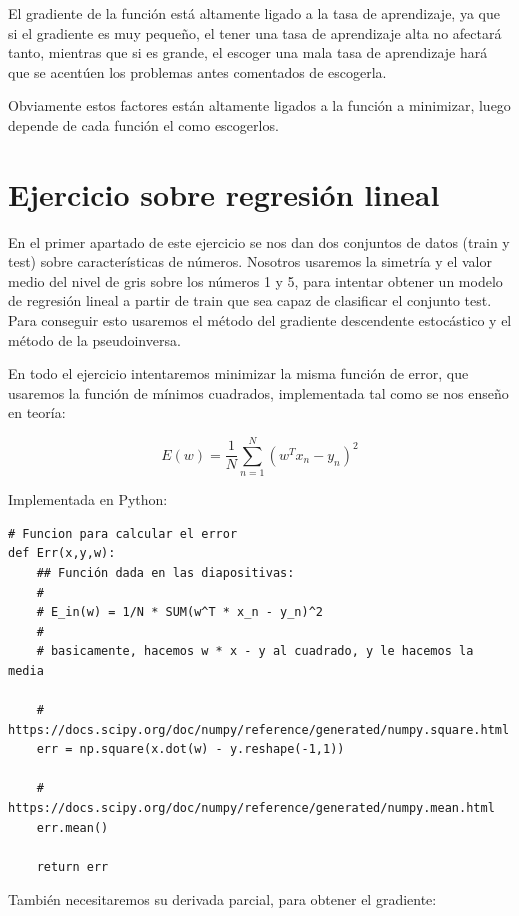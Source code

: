 \documentclass[12pt, spanish]{article}
\begin{document}
El gradiente de la función está altamente ligado a la tasa de aprendizaje, ya que si el gradiente es muy pequeño, el tener una tasa de aprendizaje alta no afectará tanto, mientras que si es grande, el escoger una mala tasa de aprendizaje hará que se acentúen los problemas antes comentados de escogerla.

Obviamente estos factores están altamente ligados a la función a minimizar, luego depende de cada función el como escogerlos.









\section{Ejercicio sobre regresión lineal}

En el primer apartado de este ejercicio se nos dan dos conjuntos de datos (train y test) sobre características de números. Nosotros usaremos la simetría y el valor medio del nivel de gris sobre los números 1 y 5, para intentar obtener un modelo de regresión lineal a partir de train que sea capaz de clasificar el conjunto test. Para conseguir esto usaremos el método del gradiente descendente estocástico y el método de la pseudoinversa.


En todo el ejercicio intentaremos minimizar la misma función de error, que usaremos la función de mínimos cuadrados, implementada tal como se nos enseño en teoría:

$$ E (w) = \frac{1}{N}\sum_{n = 1}^{N} (w^Tx_n-y_n)^2$$ 

Implementada en Python:


\begin{lstlisting}
# Funcion para calcular el error
def Err(x,y,w):
	## Función dada en las diapositivas:
	#
	# E_in(w) = 1/N * SUM(w^T * x_n - y_n)^2
	#
	# basicamente, hacemos w * x - y al cuadrado, y le hacemos la media

	# https://docs.scipy.org/doc/numpy/reference/generated/numpy.square.html
	err = np.square(x.dot(w) - y.reshape(-1,1))

	# https://docs.scipy.org/doc/numpy/reference/generated/numpy.mean.html
	err.mean()

	return err

\end{lstlisting}

\newpage

También necesitaremos su derivada parcial, para obtener el gradiente:
\end{document}
